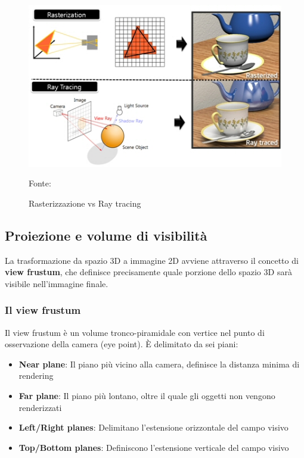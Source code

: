\begin{figure}[htbp]
	\centering
	\includegraphics[width=1\textwidth]{images/rasterization_vs_ray_tracing.jpg}
	\caption{Rasterizzazione vs Ray tracing}
	Fonte: \cite{rasterization_vs_ray_tracing}
\end{figure}

\newpage
\subsection{Proiezione e volume di visibilità}

La trasformazione da spazio 3D a immagine 2D avviene attraverso il concetto di \textbf{view frustum}, che definisce precisamente quale porzione dello spazio 3D sarà visibile nell'immagine finale.

\subsubsection{Il view frustum}

Il view frustum è un volume tronco-piramidale con vertice nel punto di osservazione della camera (eye point). È delimitato da sei piani:

\begin{itemize}
    \item \textbf{Near plane}: Il piano più vicino alla camera, definisce la distanza minima di rendering
    \item \textbf{Far plane}: Il piano più lontano, oltre il quale gli oggetti non vengono renderizzati
    \item \textbf{Left/Right planes}: Delimitano l'estensione orizzontale del campo visivo
    \item \textbf{Top/Bottom planes}: Definiscono l'estensione verticale del campo visivo
\end{itemize}

